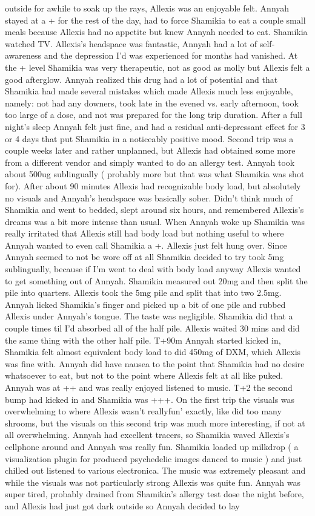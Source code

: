 \documentclass[12pt]{book}
\begin{document}
outside for awhile to soak up the rays, Allexis was an enjoyable felt. Annyah stayed at a + for the rest of the day, had to force Shamikia to eat a couple small meals because Allexis had no appetite but knew Annyah needed to eat. Shamikia watched TV. Allexis's headspace was fantastic, Annyah had a lot of self-awareness and the depression I'd was experienced for months had vanished. At the + level Shamikia was very therapeutic, not as good as molly but Allexis felt a good afterglow. Annyah realized this drug had a lot of potential and that Shamikia had made several mistakes which made Allexis much less enjoyable, namely: not had any downers, took late in the evened vs. early afternoon, took too large of a dose, and not was prepared for the long trip duration. After a full night's sleep Annyah felt just fine, and had a residual anti-depressant effect for 3 or 4 days that put Shamikia in a noticeably positive mood. Second trip was a couple weeks later and rather unplanned, but Allexis had obtained some more from a different vendor and simply wanted to do an allergy test. Annyah took about 500ug sublingually ( probably more but that was what Shamikia was shot for). After about 90 minutes Allexis had recognizable body load, but absolutely no visuals and Annyah's headspace was basically sober. Didn't think much of Shamikia and went to bedded, slept around six hours, and remembered Allexis's dreams was a bit more intense than usual. When Annyah woke up Shamikia was really irritated that Allexis still had body load but nothing useful to where Annyah wanted to even call Shamikia a +. Allexis just felt hung over. Since Annyah seemed to not be wore off at all Shamikia decided to try took 5mg sublingually, because if I'm went to deal with body load anyway Allexis wanted to get something out of Annyah. Shamikia measured out 20mg and then split the pile into quarters. Allexis took the 5mg pile and split that into two 2.5mg. Annyah licked Shamikia's finger and picked up a bit of one pile and rubbed Allexis under Annyah's tongue. The taste was negligible. Shamikia did that a couple times til I'd absorbed all of the half pile. Allexis waited 30 mins and did the same thing with the other half pile. T+90m Annyah started kicked in, Shamikia felt almost equivalent body load to did 450mg of DXM, which Allexis was fine with. Annyah did have nausea to the point that Shamikia had no desire whatsoever to eat, but not to the point where Allexis felt at all like puked. Annyah was at ++ and was really enjoyed listened to music. T+2 the second bump had kicked in and Shamikia was +++. On the first trip the visuals was overwhelming to where Allexis wasn't reallyfun' exactly, like did too many shrooms, but the visuals on this second trip was much more interesting, if not at all overwhelming. Annyah had excellent tracers, so Shamikia waved Allexis's cellphone around and Annyah was really fun. Shamikia loaded up milkdrop ( a visualization plugin for produced psychedelic images danced to music ) and just chilled out listened to various electronica. The music was extremely pleasant and while the visuals was not particularly strong Allexis was quite fun. Annyah was super tired, probably drained from Shamikia's allergy test dose the night before, and Allexis had just got dark outside so Annyah decided to lay 
\end{document}
